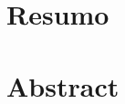 \chapter*{Resumo}

\begin{quotation}

\end{quotation}

\chapter*{Abstract}

\begin{quotation}

\end{quotation}